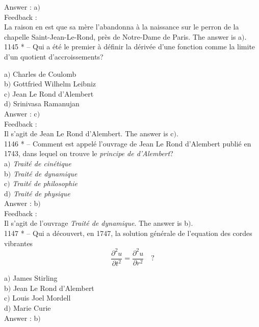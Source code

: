 \documentclass[letterpaper, 12pt]{article}
\begin{document}
Answer : a$)$\\

Feedback : \\
La raison en est que sa m\`ere l'abandonna \`a la naissance sur le
perron de la chapelle Saint-Jean-Le-Rond, pr\`es de
Notre-Dame de Paris. The answer is a$)$. \\

1145 * -- Qui a \'et\'e le premier \`a d\'efinir la d\'eriv\'ee
d'une fonction comme la limite d'un quotient d'accroissements?

a$)$ Charles de Coulomb \\
b$)$ Gottfried Wilhelm Leibniz \\
c$)$ Jean Le Rond d'Alembert \\
d$)$ Srinivasa Ramanujan  \\

Answer : c$)$\\

Feedback : \\
Il s'agit de Jean Le Rond d'Alembert. The answer is c$)$. \\

1146 * -- Comment est appel\'e l'ouvrage de Jean Le Rond d'Alembert publi\'e
en 1743, dans lequel on trouve
le {\sl principe de d'Alembert}?\\

a$)$ {\sl Trait\'e de cin\'etique}  \\
b$)$ {\sl Trait\'e de dynamique} \\
c$)$ {\sl Trait\'e de philosophie}  \\
d$)$ {\sl Trait\'e de physique}  \\

Answer : b$)$\\

Feedback : \\
Il s'agit de l'ouvrage {\sl Trait\'e de dynamique}. The answer is b$)$.
\\

1147 * -- Qui a d\'ecouvert, en 1747, la solution g\'en\'erale de
l'equation des cordes vibrantes
$$\displaystyle{\frac{\partial^2u}{\partial t^2}=\frac{\partial^2u}{\partial
r^2}}\quad?$$

a$)$ James Stirling \\
b$)$ Jean Le Rond d'Alembert \\
c$)$ Louis Joel Mordell  \\
d$)$ Marie Curie  \\

Answer : b$)$\\
\end{document}

